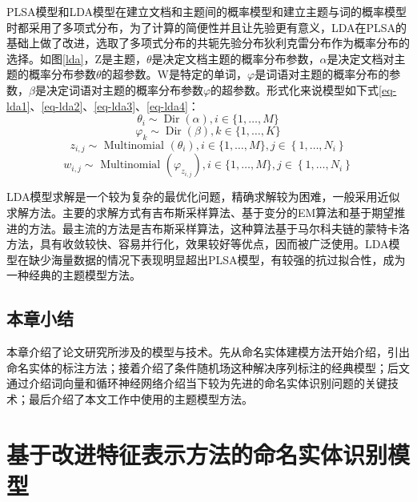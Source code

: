 \documentclass[winfonts,master,oneside,nobackinfo]{njuthesis}
\begin{document}
PLSA模型和LDA模型在建立文档和主题间的概率模型和建立主题与词的概率模型时都采用了多项式分布，为了计算的简便性并且让先验更有意义，LDA在PLSA的基础上做了改进，选取了多项式分布的共轭先验分布狄利克雷分布作为概率分布的选择。如图\ref{lda}，Z是主题，$\theta$是决定文档主题的概率分布参数，$\alpha$是决定文档对主题的概率分布参数$\theta$的超参数。W是特定的单词，$\varphi$是词语对主题的概率分布的参数，$\beta$是决定词语对主题的概率分布参数$\varphi$的超参数。形式化来说模型如下式\ref{eq-lda1}、\ref{eq-lda2}、\ref{eq-lda3}、\ref{eq-lda4}：
\begin{equation}
\theta _ { i } \sim \operatorname { Dir } ( \alpha ),   i \in \{ 1 , \ldots , M \}
\label{eq-lda1}
\end{equation}
\begin{equation}
\varphi _ { k } \sim \operatorname { Dir } ( \beta ),   k \in \{ 1 , \ldots , K \}
\label{eq-lda2}
\end{equation}
\begin{equation}
z _ { i , j } \sim \text { Multinomial } \left( \theta _ { i } \right),   i \in \{ 1 , \ldots , M \},j \in \left\{ 1 , \ldots , N _ { i } \right\}
\label{eq-lda3}
\end{equation}
\begin{equation}
w _ { i , j } \sim \text { Multinomial } \left( \varphi _ { z _ { i , j } } \right),   i \in \{ 1 , \ldots , M \},j \in \left\{ 1 , \ldots , N _ { i } \right\}
\label{eq-lda4}
\end{equation}


LDA模型求解是一个较为复杂的最优化问题，精确求解较为困难，一般采用近似求解方法。主要的求解方式有吉布斯采样算法、基于变分的EM算法和基于期望推进的方法。最主流的方法是吉布斯采样算法，这种算法基于马尔科夫链的蒙特卡洛方法，具有收敛较快、容易并行化，效果较好等优点，因而被广泛使用。LDA模型在缺少海量数据的情况下表现明显超出PLSA模型，有较强的抗过拟合性，成为一种经典的主题模型方法。

\section{本章小结}

本章介绍了论文研究所涉及的模型与技术。先从命名实体建模方法开始介绍，引出命名实体的标注方法；接着介绍了条件随机场这种解决序列标注的经典模型；后文通过介绍词向量和循环神经网络介绍当下较为先进的命名实体识别问题的关键技术；最后介绍了本文工作中使用的主题模型方法。

\chapter{基于改进特征表示方法的命名实体识别模型}
\end{document}
